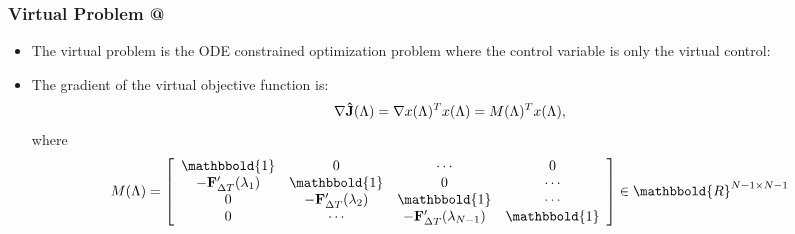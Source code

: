 \documentclass[9pt]{beamer}
\makeatletter
\newcommand*{\rom}[1]{\expandafter\@slowromancap\romannumeral #1@}
\makeatother
\begin{document}
\begin{frame}
\frametitle{Virtual Problem \rom{1}}
\begin{itemize}
\item{The virtual problem is the ODE constrained optimization problem where the control variable is only the virtual control:
}
\item{The gradient of the virtual objective function is:
{\small
\begin{align*}
\nabla \bold{\hat J}(\Lambda)= \nabla x(\Lambda)^T x(\Lambda) = M(\Lambda)^Tx(\Lambda),
\end{align*}}
where 
{\small
\begin{align*}
M(\Lambda)= \left[ \begin{array}{cccc}
   \mathbbold{1} & 0 & \cdots & 0 \\  
   -\bold{F}_{\Delta T}'(\lambda_{1}) & \mathbbold{1} & 0 & \cdots \\ 
   0 &-\bold{F}_{\Delta T}'(\lambda_{2}) & \mathbbold{1}  & \cdots \\
   0 &\cdots &-\bold{F}_{\Delta T}'(\lambda_{N-1}) & \mathbbold{1}  \\
   \end{array}  \right]\in\mathbbold{R}^{N-1\times N-1}
\end{align*}}}
\end{itemize}
\end{frame}
\end{document}
